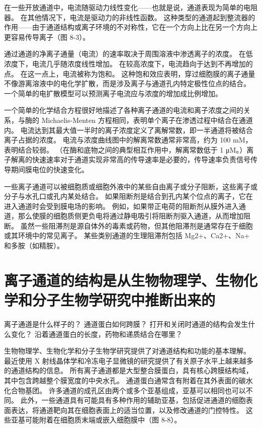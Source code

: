 在一些开放通道中，电流随驱动力线性变化——也就是说，通道表现为简单的电阻器。 在其他情况下，电流是驱动力的非线性函数。 这种类型的通道起到整流器的作用——由于通道结构或离子环境的不对称性，它在一个方向上比在另一个方向上更容易传导离子（图 8-3）。

通过通道的净离子通量（电流）的速率取决于周围溶液中渗透离子的浓度。 在低浓度下，电流几乎随浓度线性增加。 在较高浓度下，电流趋向于达到不再增加的点。 在这一点上，电流被称为饱和。 这种饱和效应表明，穿过细胞膜的离子通量不像游离溶液中的电化学扩散，而是涉及离子与通道孔内特定极性位点的结合。 一个简单的电扩散模型可以预测离子电流应与浓度的增加成比例增加。

一个简单的化学结合方程很好地描述了各种离子通道的电流和离子浓度之间的关系，与酶的 Michaelis-Menten 方程相同，表明单个离子在渗透过程中结合在通道内。 电流达到其最大值一半时的离子浓度定义了离解常数，即一半通道将被结合离子占据的浓度。 电流与浓度曲线图中的解离常数通常非常高，约为 100 mM，表明结合较弱。 （在酶和底物之间的典型相互作用中，解离常数低于 1 μM。）离子解离的快速速率对于通道实现非常高的传导速率是必要的，传导速率负责信号传导期间膜电位的快速变化。

一些离子通道可以被细胞质或细胞外液中的某些自由离子或分子阻断，这些离子或分子与水孔口或孔内某处结合。 如果阻断剂是结合到孔内某个位点的离子，它在进入通道时会受到膜电场的影响。 例如，如果带正电荷的阻断剂从膜外进入通道，那么使膜的细胞质侧更负电将通过静电吸引将阻断剂驱入通道，从而增加阻断。 虽然一些阻滞剂是源自体外的毒素或药物，但其他阻滞剂是通常存在于细胞或其环境中的常见离子。 某些类别通道的生理阻滞剂包括 Mg2+、Ca2+、Na+ 和多胺（如精胺）。


\section{离子通道的结构是从生物物理学、生物化学和分子生物学研究中推断出来的}
离子通道是什么样子的？ 通道蛋白如何跨膜？ 打开和关闭时通道的结构会发生什么变化？ 沿着通道蛋白的长度，药物和递质结合在哪里？

生物物理学、生物化学和分子生物学研究提供了对通道结构和功能的基本理解。 最近使用 X 射线晶体学和冷冻电子显微镜的研究提供了有关原子水平上越来越多的通道结构的信息。 所有离子通道都是大型整合膜蛋白，具有核心跨膜结构域，其中包含跨越整个膜宽度的中央水孔。 通道蛋白通常含有附着在其外表面的碳水化合物基团。 许多通道的成孔区由两个或多个亚基组成，亚基可以相同也可以不同。 此外，一些通道具有可能具有多种作用的辅助亚基，包括促进通道的细胞表面表达，将通道靶向其在细胞表面上的适当位置，以及修改通道的门控特性。 这些亚基可能附着在细胞质末端或嵌入细胞膜中（图 8-8）。

